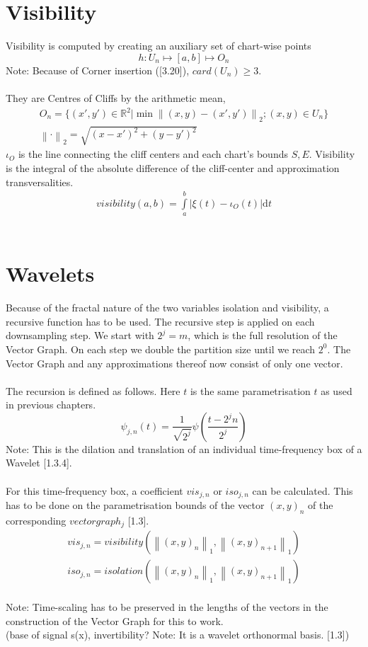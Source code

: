 \documentclass{report}
\newcommand\norm[1]{\left\lVert#1\right\rVert}
\begin{document}
\chapter{Visibility}
Visibility is computed by creating an auxiliary set of chart-wise points
\begin{equation}
h: U_{n} \mapsto [a,b] \mapsto O_{n}
\end{equation}
Note: Because of Corner insertion (\cite{Stopeight}[3.20]), $card(U_{n}) \geq 3$.\\\\
They are Centres of Cliffs by the arithmetic mean,
\begin{align}
O_{n}=\{(x',y') \in \mathbb{R}^2 \vert \min \norm{(x,y)-(x',y')}_{2};(x,y) \in U_{n} \}\\
\norm{\cdot}_{2}=\sqrt{(x-x')^2 + (y-y')^2}
\end{align}
$\iota_{O}$ is the line connecting the cliff centers and each chart's bounds $S,E$. Visibility is the integral of the absolute difference of the cliff-center and approximation transversalities.
\begin{align}
visibility(a,b)= \int \limits _{a}^{b} \vert \xi(t)-\iota_{O}(t)\vert  \mathrm{d}t
\end{align}\\

\chapter{Wavelets}
Because of the fractal nature of the two variables isolation and visibility, a recursive function has to be used. The recursive step is applied on each downsampling step. We start with $2^j=m$, which is the full resolution of the Vector Graph. On each step we double the partition size until we reach $2^0$. The Vector Graph and any approximations thereof now consist of only one vector.\\\\
The recursion is defined as follows. Here $t$ is the same parametrisation $t$ as used in previous chapters.
\begin{equation}
\psi_{j,n}(t)=\frac{1}{\sqrt{2^j}}\psi(\frac{t-2^j n}{2^j})
\end{equation}
Note: This is the dilation and translation of an individual time-frequency box of a Wavelet \cite{Mallat}[1.3.4].\\\\
For this time-frequency box, a coefficient $vis_{j,n}$ or $iso_{j,n}$ can be calculated. This has to be done on the parametrisation bounds of the vector $(x,y)_n$ of the corresponding $vectorgraph_{j}$ \cite{Grapher}[1.3].
\begin{align}
vis_{j,n}=visibility(\norm{(x,y)_{n}}_{1},\norm{(x,y)_{n+1}}_{1})\\
iso_{j,n}=isolation(\norm{(x,y)_{n}}_{1},\norm{(x,y)_{n+1}}_{1})
\end{align}\\
Note: Time-scaling has to be preserved in the lengths of the vectors in the construction of the Vector Graph for this to work.\\
(base of signal s(x), invertibility? Note: It is a wavelet orthonormal basis. \cite{Mallat}[1.3])
\end{document}
